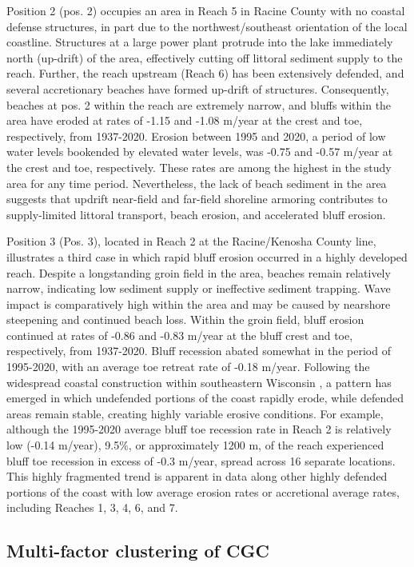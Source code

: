 Position 2 (pos. 2) occupies an area in Reach 5 in Racine County with no coastal
defense structures,  in part due to the northwest/southeast orientation of the
local coastline. Structures at a large power plant protrude into the lake
immediately north (up-drift) of the area, effectively cutting off littoral
sediment supply to the reach. Further, the reach upstream (Reach 6) has been
extensively defended, and several accretionary beaches have formed up-drift of
structures. Consequently, beaches at pos. 2 within the reach are extremely
narrow, and bluffs within the area have eroded at rates of -1.15 and -1.08
m/year at the crest and toe, respectively, from 1937-2020. Erosion between 1995
and 2020, a period of low water levels bookended by elevated water levels, was
-0.75 and -0.57 m/year at the crest and toe, respectively. These rates are among
the highest in the study area for any time period. Nevertheless, the lack of
beach sediment in the area suggests that updrift near-field and far-field
shoreline armoring  contributes to supply-limited littoral transport, beach
erosion, and accelerated bluff erosion. 

Position 3 (Pos. 3), located in Reach 2 at the Racine/Kenosha County line,
illustrates a third case in which rapid bluff erosion occurred in a highly
developed reach. Despite a longstanding groin field in the area, beaches remain
relatively narrow, indicating low sediment supply or ineffective sediment
trapping. Wave impact is comparatively high within the area and may be caused by
nearshore steepening and continued beach loss. Within the groin field, bluff
erosion continued at rates of -0.86 and -0.83 m/year at the bluff crest and toe,
respectively, from 1937-2020. Bluff recession abated somewhat in the period of
1995-2020, with an average toe retreat rate of -0.18 m/year. Following the
widespread coastal construction within southeastern Wisconsin , a pattern has
emerged in which undefended portions of the coast rapidly erode, while defended
areas remain stable, creating highly variable erosive conditions. For example,
although the 1995-2020 average bluff toe recession rate in Reach 2 is relatively
low (-0.14 m/year), 9.5\%, or approximately 1200 m, of the reach experienced
bluff toe recession in excess of -0.3 m/year, spread across 16 separate
locations. This highly fragmented trend is apparent in data along other highly
defended portions  of the coast with low average erosion rates or accretional
average rates, including Reaches 1, 3, 4, 6, and 7.

\subsection{Multi-factor clustering of CGC} 
\label{Multi-factor clustering of CGC}


